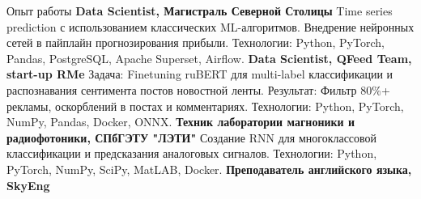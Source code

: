 \begin{rubric}{Опыт работы}
 \textbf{Data Scientist, Магистраль Северной Столицы}
\newline \qquad
    Time series prediction с использованием классических ML-алгоритмов. Внедрение нейронных сетей в пайплайн прогнозирования прибыли. 
    \newline
    Технологии: Python, PyTorch, Pandas, PostgreSQL, Apache Superset, Airflow.
 \textbf{Data Scientist, QFeed Team, start-up RMe}
\newline \qquad
    Задача: Finetuning ruBERT для multi-label классификации и распознавания сентимента постов новостной ленты.
    \newline
    Результат: Фильтр 80\%+ рекламы, оскорблений в постах и комментариях.
\newline
    Технологии: Python, PyTorch, NumPy, Pandas, Docker, ONNX.
\entry*[2021 - 2023] \textbf{Техник лаборатории магноники и радиофотоники, СПбГЭТУ "ЛЭТИ"}
\newline \qquad
    Создание RNN для многоклассовой классификации и предсказания аналоговых сигналов.
\newline
    Технологии: Python, PyTorch, NumPy, SciPy, MatLAB, Docker.
 \textbf{Преподаватель английского языка, SkyEng}

\end{rubric}